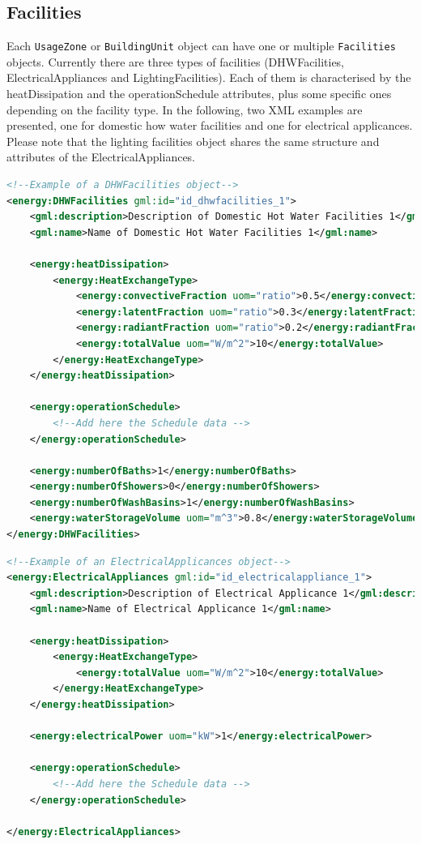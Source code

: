 \documentclass[a4paper,12pt]{article}
\begin{document}
\subsection{Facilities}\label{facilities}

Each \lstinline!UsageZone! or \lstinline!BuildingUnit! object can have
one or multiple \lstinline!Facilities! objects. Currently there are
three types of facilities (DHWFacilities, ElectricalAppliances and
LightingFacilities). Each of them is characterised by the
heatDissipation and the operationSchedule attributes, plus some specific
ones depending on the facility type. In the following, two XML examples
are presented, one for domestic how water facilities and one for
electrical applicances. Please note that the lighting facilities object
shares the same structure and attributes of the ElectricalAppliances.

\begin{lstlisting}[language=XML]
<!--Example of a DHWFacilities object-->
<energy:DHWFacilities gml:id="id_dhwfacilities_1">
    <gml:description>Description of Domestic Hot Water Facilities 1</gml:description>
    <gml:name>Name of Domestic Hot Water Facilities 1</gml:name>

    <energy:heatDissipation>
        <energy:HeatExchangeType>
            <energy:convectiveFraction uom="ratio">0.5</energy:convectiveFraction>
            <energy:latentFraction uom="ratio">0.3</energy:latentFraction>
            <energy:radiantFraction uom="ratio">0.2</energy:radiantFraction>
            <energy:totalValue uom="W/m^2">10</energy:totalValue>
        </energy:HeatExchangeType>
    </energy:heatDissipation>

    <energy:operationSchedule>
        <!--Add here the Schedule data -->
    </energy:operationSchedule>

    <energy:numberOfBaths>1</energy:numberOfBaths>
    <energy:numberOfShowers>0</energy:numberOfShowers>
    <energy:numberOfWashBasins>1</energy:numberOfWashBasins>
    <energy:waterStorageVolume uom="m^3">0.8</energy:waterStorageVolume>
</energy:DHWFacilities>
\end{lstlisting}

\begin{lstlisting}[language=XML]
<!--Example of an ElectricalApplicances object-->
<energy:ElectricalAppliances gml:id="id_electricalappliance_1">
    <gml:description>Description of Electrical Applicance 1</gml:description>
    <gml:name>Name of Electrical Applicance 1</gml:name>

    <energy:heatDissipation>
        <energy:HeatExchangeType>
            <energy:totalValue uom="W/m^2">10</energy:totalValue>
        </energy:HeatExchangeType>
    </energy:heatDissipation>

    <energy:electricalPower uom="kW">1</energy:electricalPower>

    <energy:operationSchedule>
        <!--Add here the Schedule data -->
    </energy:operationSchedule>

</energy:ElectricalAppliances>
\end{lstlisting}
\end{document}
